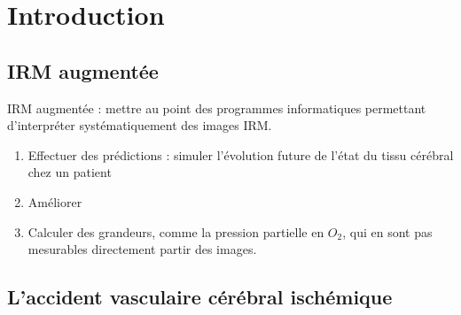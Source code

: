 \section{Introduction}

\subsection{IRM augment\'ee}



IRM augment\'ee : mettre au point des programmes informatiques permettant d'interpr\'eter syst\'ematiquement des images IRM.
\begin{enumerate}
\item Effectuer des pr\'edictions : simuler l'\'evolution future de l'\'etat du tissu c\'er\'ebral chez un patient%

\item Am\'eliorer 
\item Calculer des grandeurs, comme la pression partielle en $O_2$, qui en sont pas mesurables directement  partir des images.
\end{enumerate}



\subsection{L'accident vasculaire c\'er\'ebral isch\'emique}